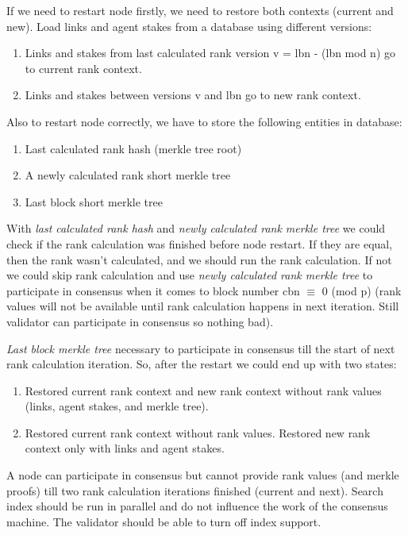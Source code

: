 \documentclass[8pt,oneside]{amsart}
\newcommand{\code}[1]{{\PlayBold #1}}
\begin{document}
If we need to restart node firstly, we need to restore both contexts (current and new).
Load links and agent stakes from a database using different versions:

\begin{enumerate}
  \item Links and stakes from last calculated rank version \code{v = lbn - (lbn mod n)} go to current rank context.
  \item Links and stakes between versions \code{v} and \code{lbn} go to new rank context.
\end{enumerate}

Also to restart node correctly, we have to store the following entities in database:

\begin{enumerate}
  \item Last calculated rank hash (merkle tree root)
  \item A newly calculated rank short merkle tree
  \item Last block short merkle tree
\end{enumerate}

With \textit{last calculated rank hash} and \textit{newly calculated rank merkle tree} we could check if the rank 
calculation was finished before node restart. If they are equal, then the rank wasn't calculated, and we should run the rank calculation.
 If not we could skip rank calculation and use \textit{newly calculated rank merkle tree} to participate in consensus when it comes to block number \code{cbn $\equiv$ 0 (mod p)} (rank values will not be available until rank calculation happens in next iteration. Still validator can participate in consensus so nothing bad).

\textit{Last block merkle tree} necessary to participate in consensus till the start of next rank calculation iteration. So, after the restart we could end up with two states:

\begin{enumerate}
\item Restored current rank context and new rank context without rank values (links, agent stakes, and merkle tree).
\item Restored current rank context without rank values. Restored new rank context only with links and agent stakes.
\end{enumerate}

A node can participate in consensus but cannot provide rank values (and merkle proofs) till two rank calculation iterations finished (current and next). Search index should be run in parallel and do not influence the work of the consensus machine. The validator should be able to turn off index support.
\end{document}
